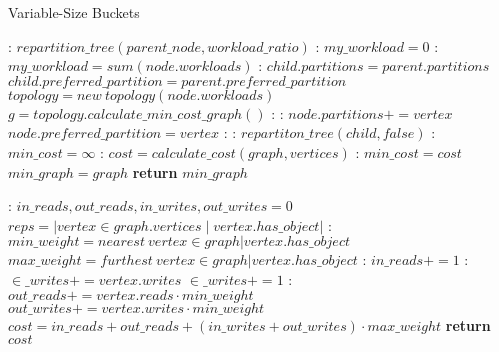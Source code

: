 \documentclass[mscthesis,12pt]{usiinfthesis}
\begin{document}
\begin{algorithm}
	\caption{Variable-Size Buckets}\label{alg:variable-size}
	\begin{algorithmic}[1]
	  :
	\State $repartition\_tree(parent\_node, workload\_ratio)$
	\EndFunction
	:
	  \State $my\_workload = 0$
	  :
		\State $my\_workload = sum(node.workloads)$
		:
		\State $child.partitions = parent.partitions$
		\State $child.preferred\_partition = parent.preferred\_partition$
		\Else
		\State $topology = new\ topology(node.workloads)$
		\State $g = topology.calculate\_min\_cost\_graph()$
		:
		  :
		  \State $node.partitions += vertex$
			  \State $node.preferred\_partition = vertex$
			\EndIf
		  \EndIf
		\EndFor
	  \EndIf
	  \EndIf
	  :
		:
		  \State $repartiton\_tree(child, false)$
		  \EndFor
	  \EndIf
	  \EndFunction
	  :
	  \State $min\_cost = \infty$
		:
		  \State $cost = calculate\_cost(graph, vertices)$
		  :
			\State $min\_cost = cost$
			\State $min\_graph = graph$
		  \EndIf
		\EndFor
	  \State \textbf{return} $min\_graph$
	  \EndFunction
	\end{algorithmic}
\end{algorithm}
\begin{algorithm}
	\begin{algorithmic}[1]
	  :
		\State $in\_reads, out\_reads, in\_writes, out\_writes = 0$
		\State $reps = |vertex \in graph.vertices \mid vertex.has\_object|$
		:
		\State $min\_weight = nearest\ vertex \in graph | vertex.has\_object$
		\State $max\_weight = furthest\ vertex \in graph | vertex.has\_object$
		  :
			\State $in\_reads+= 1$
			:
			\State $\in\_writes+= vertex.writes$
			\Else
			\State  $\in\_writes+= 1 $
			\EndIf
		  \Else:
			\State $out\_reads += vertex.reads \cdot min\_weight$
			\State $out\_writes += vertex.writes \cdot min\_weight$
		  \EndIf
		\EndFor
		\State $cost = in\_reads+ out\_reads + (in\_writes+ out\_writes) \cdot max\_weight$
		\State \textbf{return} $cost$
	\EndFunction
	\end{algorithmic}
\end{algorithm}
\end{document}
